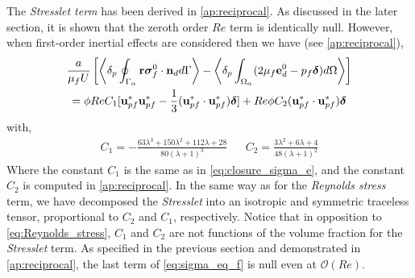 The \textit{Stresslet term} has been derived in \ref{ap:reciprocal}. 
As discussed in the later section, it is shown that the zeroth order $Re$ term is identically null. 
However, when first-order inertial effects are considered then we have (see \ref{ap:reciprocal}),
\begin{multline}
    \frac{a}{\mu_f U}\left[
        \pSavg{\textbf{r}\bm{\sigma}_f^0 \cdot \textbf{n}_d}
        - \pOavg{(2 \mu_f \textbf{e}_d^0 - p_f\bm\delta)}
        \right]\\
    =
     \phi Re C_1
    [
        \textbf{u}_{pf}^*\textbf{u}_{pf}^* - \frac{1}{3}(\textbf{u}_{pf}^*\cdot \textbf{u}_{pf}^*)\bm\delta 
    ]
    + Re \phi C_2 (\textbf{u}_{pf}^*\cdot \textbf{u}_{pf}^*) \bm\delta
    \label{eq:stresslet_trans}
\end{multline} 
with, 
\begin{align}
    C_1  =  -\frac{63 \lambda^{3} + 150 \lambda^{2} + 112 \lambda + 28}{80 \left(\lambda + 1\right)^{3}}
    &&
    C_2  = \frac{3\lambda^2 + 6\lambda + 4}{48(\lambda +1 )^2}
\end{align}
Where the constant $C_1$ is the same as in \ref{eq:closure_sigma_e}, and the constant $C_2$ is computed in  \ref{ap:reciprocal}. 
In the same way as for the \textit{Reynolds stress} term, we have decomposed the \textit{Stresslet} into an isotropic and symmetric traceless tensor, proportional to $C_2$ and $C_1$, respectively. 
Notice that in opposition to \ref{eq:Reynolds_stress}, $C_1$ and $C_2$ are not functions of the volume fraction for the \textit{Stresslet} term. 
As specified in the previous section and demonstrated in \ref{ap:reciprocal}, the last term of \ref{eq:sigma_eq_f} is null even at $\mathcal{O}(Re)$. 


